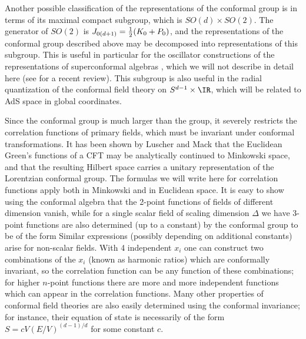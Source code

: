 Another possible classification of the representations of the
conformal group is in terms of its maximal compact subgroup, which is
$SO(d)\times SO(2)$. The generator of $SO(2)$ is $J_{0(d+1)} = {1\over
2}(K_0+P_0)$, and the representations of the conformal group described
above may be decomposed into representations of this subgroup. This is
useful in particular for the oscillator constructions of the
representations of superconformal algebras 
\cite{Gunaydin:1982yq,Bars:1983ep,Gunaydin:1985fk,Gunaydin:1985vz,
Gunaydin:1985wc,Gunaydin:1986tc,Gunaydin:1987hb}, which we will not
describe in detail here (see \cite{Minic:1999eq} for a recent review).
This subgroup is also useful in the radial quantization of the
conformal field theory on $S^{d-1}\times \IR$, which will be related to
AdS space in global coordinates.

Since the conformal group is much larger than the \Poincare group, it
severely restricts the correlation functions of primary fields, which
must be invariant under conformal transformations. 
It has been shown by
Luscher and Mack \cite{Luscher:1974ez} that the Euclidean Green's
functions of a CFT may be analytically continued to Minkowski space,
and that the resulting Hilbert space carries a unitary representation
of the Lorentzian conformal group. The formulas we will write here for
correlation functions apply both in Minkowski and in Euclidean space.
It is easy to show using the
conformal algebra that the 2-point functions of fields of different
dimension vanish, while for a single scalar field of scaling dimension
$\Delta$ we have
3-point functions are also determined (up to a constant) by the
conformal group to be of the form
Similar expressions (possibly depending on additional constants) arise
for non-scalar fields.
With 4 independent $x_i$ one can construct two combinations of the $x_i$
(known as harmonic ratios)
which are conformally invariant, so the correlation function can be any
function of these combinations; for higher $n$-point functions there are
more and more independent functions which can appear in the
correlation functions. Many other properties of conformal field
theories are also easily determined using the conformal invariance;
for instance, their equation of state is necessarily of the form $S =
c V (E / V)^{(d-1)/d}$ for some constant $c$.


